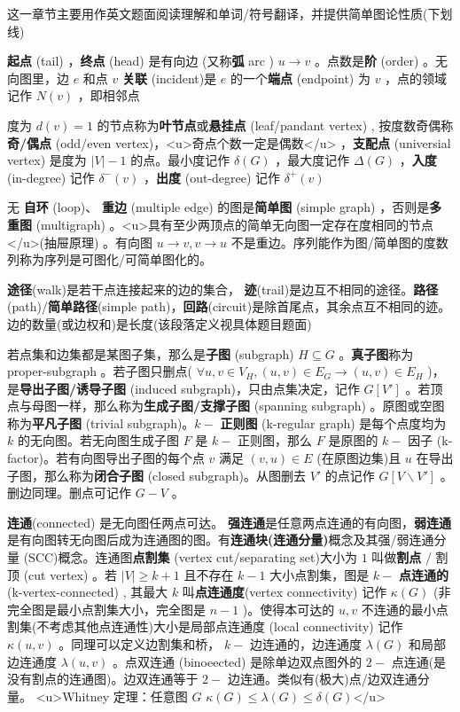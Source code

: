 \documentclass[twocolumn,10pt]{ctexart}
\begin{document}
\begin{notebox}
这一章节主要用作英文题面阅读理解和单词/符号翻译，并提供简单图论性质(下划线)
\end{notebox}

\textbf{起点} (tail) ，\textbf{终点} (head) 是有向边 (又称\textbf{弧} arc )  $u\to v$ 。点数是\textbf{阶} (order) 。无向图里，边 $e$ 和点 $v$ \textbf{关联} (incident)是 $e$ 的一个\textbf{端点} (endpoint) 为 $v$ ，点的领域记作 $N(v)$ ，即相邻点

度为 $d(v)=1$ 的节点称为\textbf{叶节点}或\textbf{悬挂点} (leaf/pandant vertex) , 按度数奇偶称\textbf{奇/偶点} (odd/even vertex)，<u>奇点个数一定是偶数</u> ，\textbf{支配点} (universial vertex) 是度为 $|V|-1$ 的点。最小度记作 $\delta(G)$ ，最大度记作 $\Delta(G)$ ，\textbf{入度} (in-degree) 记作 $\delta^-(v)$ ，\textbf{出度} (out-degree) 记作 $\delta^+(v)$

无 \textbf{自环} (loop)、 \textbf{重边} (multiple edge) 的图是\textbf{简单图} (simple graph) ，否则是\textbf{多重图} (multigraph) 。<u>具有至少两顶点的简单无向图一定存在度相同的节点</u>(抽屉原理) 。有向图 $u\to v,v\to u$ 不是重边。序列能作为图/简单图的度数列称为序列是可图化/可简单图化的。

\textbf{途径}(walk)是若干点连接起来的边的集合， \textbf{迹}(trail)是边互不相同的途径。\textbf{路径}(path)/\textbf{简单路径}(simple path)，\textbf{回路}(circuit)是除首尾点，其余点互不相同的迹。边的数量(或边权和)是长度(该段落定义视具体题目题面)

若点集和边集都是某图子集，那么是\textbf{子图} (subgraph) $H\subseteq G$ 。\textbf{真子图}称为 proper-subgraph 。若子图只删点( $\forall u,\allowbreak{}v\in V_H,\allowbreak{}(u,\allowbreak{}v)\in E_G\to(u,\allowbreak{}v)\in E_H$ )，是\textbf{导出子图/诱导子图} (induced subgraph)，只由点集决定，记作 $G[V']$ 。若顶点与母图一样，那么称为\textbf{生成子图/支撑子图} (spanning subgraph) 。原图或空图称为\textbf{平凡子图} (trivial subgraph)。$k-$ \textbf{正则图} (k-regular graph) 是每个点度均为 $k$ 的无向图。若无向图生成子图 $F$ 是 $k-$ 正则图，那么 $F$ 是原图的 $k-$ 因子 (k-factor)。若有向图导出子图的每个点 $v$ 满足 $(v,u)\in E$ (在原图边集)且 $u$ 在导出子图，那么称为\textbf{闭合子图} (closed subgraph)。从图删去 $V'$ 的点记作 $G[V\backslash V']$ 。删边同理。删点可记作 $G-V$ 。

\textbf{连通}(connected) 是无向图任两点可达。 \textbf{强连通}是任意两点连通的有向图，\textbf{弱连通}是有向图转无向图后成为连通图的图。有\textbf{连通块(连通分量)}概念及其强/弱连通分量 (SCC)概念。连通图\textbf{点割集} (vertex cut/separating set)大小为 $1$ 叫做\textbf{割点} / 割顶 (cut vertex) 。若 $|V|\ge k+1$ 且不存在 $k-1$ 大小点割集，图是 $k-$ \textbf{点连通的} (k-vertex-connected) , 其最大 $k$ 叫\textbf{点连通度}(vertex connectivity) 记作 $\kappa(G)$ (非完全图是最小点割集大小，完全图是 $n-1$ )。使得本可达的 $u,v$ 不连通的最小点割集(不考虑其他点连通性)大小是局部点连通度 (local connectivity) 记作 $\kappa(u,v)$ 。同理可以定义边割集和桥， $k-$ 边连通的，边连通度 $\lambda(G)$ 和局部边连通度 $\lambda(u,v)$ 。点双连通 (binoeected) 是除单边双点图外的 $2-$ 点连通(是没有割点的连通图)。边双连通等于 $2-$ 边连通。类似有(极大)点/边双连通分量。 <u>Whitney 定理：任意图 $G$ $\kappa(G)\le \lambda(G)\le\delta(G)$</u>
\end{document}
